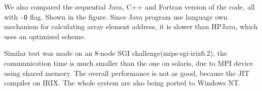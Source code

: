 We also compared the sequential Java, C++ and Fortran version of the
code, all with \texttt{-O} flag. Shown in the figure. Since Java
program use language own mechanism for calculating array element
address, it is slower than HPJava, which uses an optimized scheme.

Similar test was made on an 8-node SGI challenge(mips-sgi-irix6.2),
the communication time is much smaller than the one on solaris, due to
MPI device using shared memory.  The overall performance is not as
good, because the JIT compiler on IRIX. The whole system are also
being ported to Windows NT.

